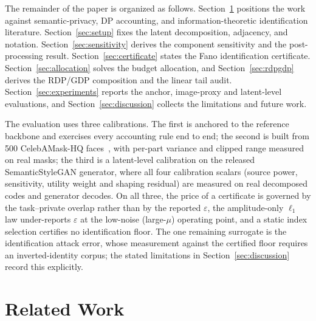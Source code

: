 \documentclass[10pt,twocolumn,letterpaper]{article}
\theoremstyle{plain}
\theoremstyle{definition}
\begin{document}
The remainder of the paper is organized as follows.
Section~\ref{sec:related} positions the work against semantic-privacy, DP
accounting, and information-theoretic identification literature.
Section~\ref{sec:setup} fixes the latent decomposition, adjacency, and notation.
Section~\ref{sec:sensitivity} derives the component sensitivity and the
post-processing result. Section~\ref{sec:certificate} states the Fano
identification certificate. Section~\ref{sec:allocation} solves the budget
allocation, and Section~\ref{sec:rdpgdp} derives the RDP/GDP composition and the
linear tail audit. Section~\ref{sec:experiments} reports the anchor,
image-proxy and latent-level evaluations, and Section~\ref{sec:discussion}
collects the limitations and future work.

The evaluation uses three calibrations. The first is anchored to the reference
backbone and exercises every accounting rule end to end; the second is built
from 500 CelebAMask-HQ faces~\cite{celebamaskhq}, with per-part variance and
clipped range measured on real masks; the third is a latent-level calibration
on the released SemanticStyleGAN generator, where all four calibration
scalars (source power, sensitivity, utility weight and shaping residual) are
measured on real decomposed codes and generator decodes. On all three, the
price of a certificate is governed by the task--private overlap rather than by
the reported $\varepsilon$, the amplitude-only $\ell_1$ law under-reports
$\varepsilon$ at the low-noise (large-$\mu$) operating point, and a
static index selection certifies no identification floor. The one remaining
surrogate is the identification attack error, whose measurement against the
certified floor requires an inverted-identity corpus; the stated limitations in
Section~\ref{sec:discussion} record this explicitly.

\section{Related Work}
\label{sec:related}
\end{document}
